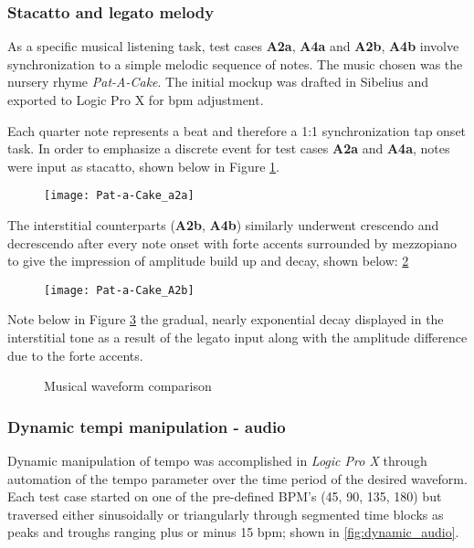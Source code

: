 \subsubsection{Stacatto and legato melody}
As a specific musical listening task, test cases \textbf{A2a}, \textbf{A4a} and \textbf{A2b}, \textbf{A4b} involve synchronization to a simple melodic sequence of notes. The music chosen was the nursery rhyme \textit{Pat-A-Cake}. The initial mockup was drafted in Sibelius and exported to Logic Pro X for bpm adjustment.

Each quarter note represents a beat and therefore a 1:1 synchronization tap onset task. In order to emphasize a discrete event for test cases \textbf{A2a} and \textbf{A4a}, notes were input as stacatto, shown below in Figure \ref{fig:patacakea2a}.

\begin{figure}[H]
    \centering
    \texttt{[image: Pat-a-Cake\_a2a]}
    \label{fig:patacakea2a}
\end{figure}

The interstitial counterparts (\textbf{A2b}, \textbf{A4b}) similarly underwent crescendo and decrescendo after every note onset with forte accents surrounded by mezzopiano to give the impression of amplitude build up and decay, shown below: \ref{fig:pat-a-cake_a2b} 

\begin{figure}[H]
    \centering
    \texttt{[image: Pat-a-Cake\_A2b]}
    \label{fig:pat-a-cake_a2b}
\end{figure}

Note below in Figure \ref{fig:music_comparison} the gradual, nearly exponential decay displayed in the interstitial tone as a result of the legato input along with the amplitude difference due to the forte accents.

\begin{figure}[H]
    \centering
    \caption{Musical waveform comparison}
        \qquad
    \label{fig:music_comparison}
\end{figure}

\subsubsection{Dynamic tempi manipulation - audio}
Dynamic manipulation of tempo was accomplished in \textit{Logic Pro X} through automation of the tempo parameter over the time period of the desired waveform. Each test case started on one of the pre-defined BPM's (45, 90, 135, 180) but traversed either sinusoidally or triangularly through segmented time blocks as peaks and troughs ranging plus or minus 15 bpm; shown in \ref{fig:dynamic_audio}.

